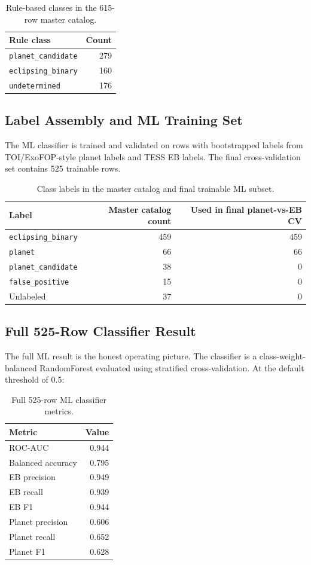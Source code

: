 \documentclass[11pt,a4paper]{article}
\newcommand{\code}[1]{\texttt{#1}}
\begin{document}
\begin{table}[H]
\centering
\caption{Rule-based classes in the 615-row master catalog.}
\begin{tabular}{@{}lr@{}}
\toprule
Rule class & Count \\
\midrule
\code{planet_candidate} & 279 \\
\code{eclipsing_binary} & 160 \\
\code{undetermined} & 176 \\
\bottomrule
\end{tabular}
\end{table}

\subsection{Label Assembly and ML Training Set}

The ML classifier is trained and validated on rows with bootstrapped labels from TOI/ExoFOP-style planet labels and TESS EB labels. The final cross-validation set contains 525 trainable rows.

\begin{table}[H]
\centering
\caption{Class labels in the master catalog and final trainable ML subset.}
\begin{tabular}{@{}lrr@{}}
\toprule
Label & Master catalog count & Used in final planet-vs-EB CV \\
\midrule
\code{eclipsing_binary} & 459 & 459 \\
\code{planet} & 66 & 66 \\
\code{planet_candidate} & 38 & 0 \\
\code{false_positive} & 15 & 0 \\
Unlabeled & 37 & 0 \\
\bottomrule
\end{tabular}
\end{table}

\subsection{Full 525-Row Classifier Result}

The full ML result is the honest operating picture. The classifier is a class-weight-balanced RandomForest evaluated using stratified cross-validation. At the default threshold of 0.5:

\begin{table}[H]
\centering
\caption{Full 525-row ML classifier metrics.}
\begin{tabular}{@{}lr@{}}
\toprule
Metric & Value \\
\midrule
ROC-AUC & 0.944 \\
Balanced accuracy & 0.795 \\
EB precision & 0.949 \\
EB recall & 0.939 \\
EB F1 & 0.944 \\
Planet precision & 0.606 \\
Planet recall & 0.652 \\
Planet F1 & 0.628 \\
\bottomrule
\end{tabular}
\end{table}
\end{document}
